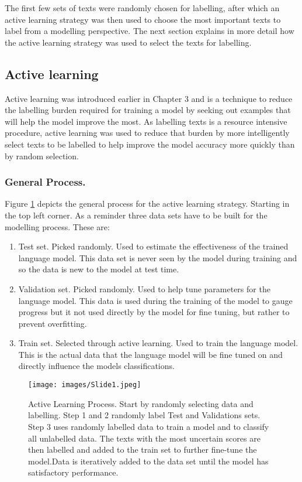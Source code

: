The first few sets of texts were randomly chosen for labelling, after which an active learning strategy was then used to choose the most important texts to label from a modelling perspective. The next section explains in more detail how the active learning strategy was used to select the texts for labelling.


\subsection{Active learning}Active learning was introduced earlier in Chapter 3 and is a technique to reduce the labelling burden required for training a model by seeking out examples that will help the model improve the most. As labelling texts is a resource intensive procedure, active learning was used to reduce that burden by more intelligently select texts to be labelled to help improve the model accuracy more quickly than by random selection. 


\subsubsection{General Process.}  

Figure \ref{fig:active_process} depicts the general process for the active learning strategy. Starting in the top left corner. As a reminder three data sets have to be built for the modelling process. These are:

\begin{enumerate}
    \item Test set. Picked randomly. Used to estimate the effectiveness of the trained language model. This data set is never seen by the model during training and so the data is new to the model at test time.
    \item Validation set. Picked randomly. Used to help tune parameters for the language model. This data is used during the training of the model to gauge progress but it not used directly by the model for fine tuning, but rather to prevent overfitting.
    \item Train set. Selected through active learning. Used to train the language model. This is the actual data that the language model will be fine tuned on and directly influence the models classifications.
\end{enumerate}

\begin{figure}[!h]
  \centering
    \texttt{[image: images/Slide1.jpeg]}
    \caption{Active Learning Process. Start by randomly selecting data and labelling. Step 1 and 2 randomly label Test and Validations sets. Step 3 uses randomly labelled data to train a model and to classify all unlabelled data. The texts with the most uncertain scores are then labelled and added to the train set to further fine-tune the model.Data is iteratively added to the data set until the model has satisfactory performance.}
    \label{fig:active_process}
\end{figure}

